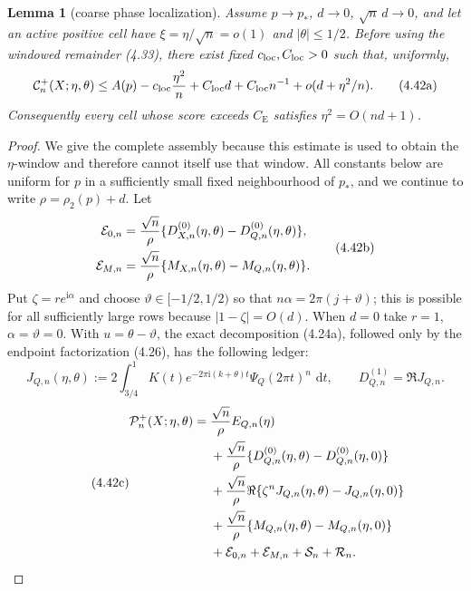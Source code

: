 \documentclass[11pt,a4paper]{article}
\numberwithin{equation}{section}
\newtheorem{lemma}[theorem]{Lemma}
\theoremstyle{definition}
\theoremstyle{remark}
\newcommand{\ii}{\mathrm i}
\newcommand{\dd}{\,\mathrm d}
\newcommand{\CE}{C_{\mathrm E}}
\begin{document}
\begin{lemma}[coarse phase localization]\label{orig:lem:coarsephase}
Assume $p\to p_*$, $d\to0$, $\sqrt n\,d\to0$, and let an active positive
cell have $\xi=\eta/\sqrt n=o(1)$ and $|\theta|\le1/2$.  Before using the
windowed remainder (4.33), there exist fixed
$c_{\rm loc},C_{\rm loc}>0$ such that, uniformly,
\[
 \mathcal C_n^+(X;\eta,\theta)
 \le A(p)-c_{\rm loc}{\eta^2\over n}+C_{\rm loc}d+C_{\rm loc}n^{-1}
       +o(d+\eta^2/n).                                \tag{4.42a}
\]
Consequently every cell whose score exceeds $\CE$ satisfies
$\eta^2=O(nd+1)$.
\end{lemma}

\begin{proof}
We give the complete assembly because this estimate is used to obtain the
$\eta$-window and therefore cannot itself use that window.  All constants
below are uniform for $p$ in a sufficiently small fixed neighbourhood of
$p_*$, and we continue to write $\rho=\rho_2(p)+d$.  Let
\[
 \begin{aligned}
 \mathcal E_{0,n}&={\sqrt n\over\rho}
       \{D^{(0)}_{X,n}(\eta,\theta)-D^{(0)}_{Q,n}(\eta,\theta)\},\\
 \mathcal E_{M,n}&={\sqrt n\over\rho}
       \{M_{X,n}(\eta,\theta)-M_{Q,n}(\eta,\theta)\}.
 \end{aligned}                                             \tag{4.42b}
\]
Put $\zeta=re^{\ii\alpha}$ and choose
$\vartheta\in[-1/2,1/2)$ so that
$n\alpha=2\pi(j+\vartheta)$; this is possible for all sufficiently large
rows because $|1-\zeta|=O(d)$.  When $d=0$ take
$r=1$, $\alpha=\vartheta=0$.  With $u=\theta-\vartheta$, the exact
decomposition (4.24a), followed only by the endpoint factorization
(4.26), has the following ledger:
\[
 J_{Q,n}(\eta,\theta):=2\int_{3/4}^1K(t)
 e^{-2\pi\ii(k+\theta)t}\Psi_Q(2\pi t)^n\,\dd t,
 \qquad D^{(1)}_{Q,n}=\Re J_{Q,n}.
\]
\begin{equation}\tag{4.42c}
\begin{split}
 \mathcal P_n^+(X;\eta,\theta)={}&{\sqrt n\over\rho}E_{Q,n}(\eta)\\
 &+{\sqrt n\over\rho}
   \{D^{(0)}_{Q,n}(\eta,\theta)-D^{(0)}_{Q,n}(\eta,0)\}\\
 &+{\sqrt n\over\rho}\Re\{\zeta^nJ_{Q,n}(\eta,\theta)
                                      -J_{Q,n}(\eta,0)\}\\
 &+{\sqrt n\over\rho}
   \{M_{Q,n}(\eta,\theta)-M_{Q,n}(\eta,0)\}\\
 &+\mathcal E_{0,n}+\mathcal E_{M,n}
   +\mathcal S_n+\mathcal R_n .

\end{split}
\end{equation}
\end{proof}
\end{document}
